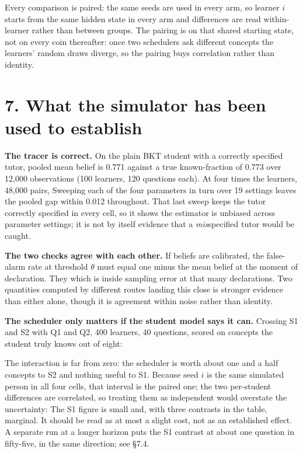 \documentclass[11pt]{article}
\begin{document}
Every comparison is paired: the same seeds are used in every arm, so learner
$i$ starts from the same hidden state in every arm and differences are read
within-learner rather than between groups. The pairing is on that shared
starting state, not on every coin thereafter: once two schedulers ask
different concepts the learners' random draws diverge, so the pairing buys
correlation rather than identity.

\section*{7. What the simulator has been used to establish}

\textbf{The tracer is correct.} On the plain BKT student with a correctly
specified tutor, pooled mean belief is 0.771 against a true known-fraction of
0.773 over 12{,}000 observations (100 learners, 120 questions each). At four
times the learners, 48{,}000 pairs,  Sweeping each of the four
parameters in turn over 19 settings leaves the pooled gap within 0.012
throughout. That last sweep keeps the tutor correctly specified in every cell,
so it shows the estimator is unbiased across parameter settings; it is not by
itself evidence that a \emph{mis}specified tutor would be caught.

\textbf{The two checks agree with each other.} If beliefs are calibrated, the
false-alarm rate at threshold $\theta$ must equal one minus the mean belief at
the moment of declaration. They 
which is inside sampling error at that many declarations. Two quantities
computed by different routes landing this close is stronger evidence than
either alone, though it is agreement within noise rather than identity.

\textbf{The scheduler only matters if the student model says it can.} Crossing
S1 and S2 with Q1 and Q2, 400 learners, 40 questions, scored on concepts the
student truly knows out of eight:



\noindent The interaction is far from zero: the scheduler is worth about one
and a half concepts to S2 and nothing useful to S1. Because seed $i$ is the
same simulated person in all four cells, that interval is the paired one; the
two per-student differences are correlated, so treating them as independent
would overstate the uncertainty: 
The S1 figure is small and, with three contrasts in the table, marginal. It
should be read as at most a slight cost, not as an established effect. A
separate run at a longer horizon puts the S1 contrast at about one question
in fifty-five, in the same direction; see \S7.4.
\end{document}
